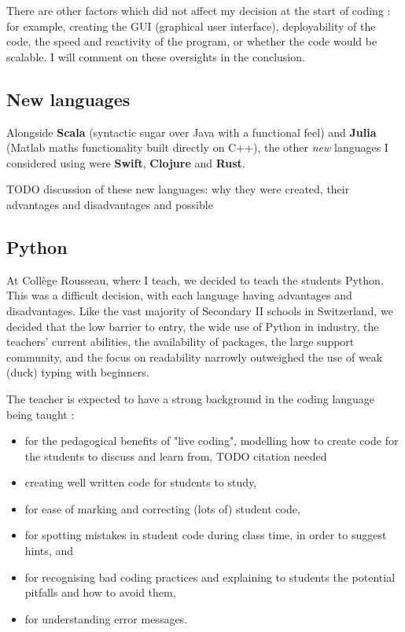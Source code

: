 \documentclass[10pt]{article}
\begin{document}
There are other factors which did not affect my decision at the start of coding : for example, creating the GUI (graphical user interface), deployability of the code, the speed and reactivity of the program, or whether the code would be scalable. I will comment on these oversights in the conclusion.



\subsection{New languages}
Alongside \textbf{Scala} (syntactic sugar over Java with a functional feel) and \textbf{Julia} (Matlab maths functionality built directly on C++), the other \emph{new} languages I considered using were \textbf{Swift}, \textbf{Clojure} and \textbf{Rust}.

TODO discussion of these new languages: why they were created, their advantages and disadvantages and possible 

\subsection{Python} \label{python}
At Collège Rousseau, where I teach, we decided to teach the students Python. This was a difficult decision, with each language having advantages and disadvantages. Like the vast majority of Secondary II schools in Switzerland, we decided that the low barrier to entry, the wide use of Python in industry, the teachers' current abilities, the availability of packages, the large support community, and the focus on readability narrowly outweighed the use of weak (duck) typing with beginners.

The teacher is expected to have a strong background in the coding language being taught :
\begin{itemize}
\item for the pedagogical benefits of "live coding", modelling how to create code for the students to discuss and learn from, TODO citation needed
\item creating well written code for students to study,
\item for ease of marking and correcting (lots of) student code,
\item for spotting mistakes in student code during class time, in order to suggest hints, and
\item for recognising bad coding practices and explaining to students the potential pitfalls and how to avoid them,
\item for understanding error messages.
\end{itemize}
\end{document}

